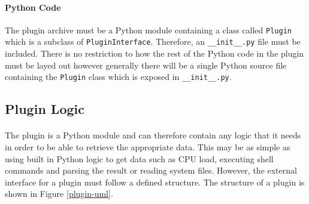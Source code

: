 \documentclass[bsc,logo,twoside,singlespacing,notimes]{infthesis}
\begin{document}
\paragraph*{Python Code}
	The plugin archive must be a Python module containing a class called 
	\texttt{Plugin} which is a subclass of \texttt{PluginInterface}.  Therefore, an
	\texttt{\_\_init\_\_.py} file must be included.  There is no restriction to how
	the rest of the Python code in the plugin must be layed out however generally
	there will be a single Python source file containing the \texttt{Plugin} class
	which is exposed in \texttt{\_\_init\_\_.py}.

\subsection{Plugin Logic} %
\paragraph*{}
	The plugin is a Python module and can therefore contain any logic that it needs
	in order to be able to retrieve the appropriate data.  This may be as simple as
	using built in Python logic to get data such as CPU load, executing shell
	commands and parsing the result or reading system files.  However, the external
	interface for a plugin must follow a defined structure.  The structure of a
	plugin is shown in Figure \ref{plugin-uml}.
	
\end{document}
